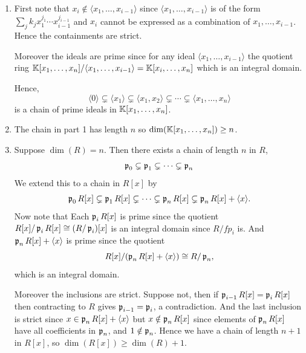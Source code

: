 \documentclass[Notebook.tex]{subfiles}
\begin{document}
\begin{solution}
    \bbni
    \begin{enumerate}
        \item First note that $x_i \notin \langle x_1, \ldots, x_{i-1}\rangle$ since $\langle x_1, \ldots, x_{i-1}\rangle$ is of the form $\sum_j k_jx_1^{j_1} \cdots x_{i-1}^{j_{i-1}}$ and $x_i$ cannot be expressed as a combination of $x_1, \ldots, x_{i-1}$. Hence the containments are strict. 
        
        Moreover the ideals are prime since for any ideal $\langle x_1, \ldots, x_{i-1}\rangle$ the quotient ring $\mathbb K[x_1, \ldots, x_n]/\langle x_1, \ldots, x_{i-1}\rangle = \mathbb K[x_{i}, \ldots, x_n]$ which is an integral domain. 

        Hence,  \[
        \langle 0\rangle
        \subsetneq
        \langle x_1\rangle
        \subsetneq
        \langle x_1,x_2\rangle
        \subsetneq
        \cdots
        \subsetneq
        \langle x_1,\ldots,x_n\rangle
        \]
        is a chain of prime ideals in $\mathbb K[x_1,\ldots,x_n]$.

        \item The chain in part 1 has length $n$ so $\dim(\mathbb K[x_1, \ldots, x_n]) \geq n$. 
        
        \item Suppose $\dim(R) = n$. Then there exists a chain of length $n$ in $R$, 
        \[\operatorname{\mathfrak{p}}_0 \subsetneq \operatorname{\mathfrak{p}}_1 \subsetneq \cdots \subsetneq \operatorname{\mathfrak{p}}_n\]
        We extend this to a chain in $R[x]$ by 
        \[
        \operatorname{\mathfrak{p}}_0R[x] \subsetneq \operatorname{\mathfrak{p}}_1R[x] \subsetneq \cdots \subsetneq \operatorname{\mathfrak{p}}_nR[x] \subsetneq \operatorname{\mathfrak{p}}_nR[x] + \langle x\rangle.
        \]
        Now note that Each $\operatorname{\mathfrak{p}}_iR[x]$ is prime since the quotient $R[x]/\operatorname{\mathfrak{p}}_iR[x] \cong (R/\operatorname{\mathfrak{p}}_i)[x]$ is an integral domain since $R/fp_i$ is. And $\operatorname{\mathfrak{p}}_nR[x] + \langle x\rangle$ is prime since the quotient 
        \[R[x]/(\operatorname{\mathfrak{p}}_nR[x] + \langle x\rangle) \cong R/\operatorname{\mathfrak{p}}_n,\]
        which is an integral domain.

        
        Moreover the inclusions are strict. Suppose not, then if $\operatorname{\mathfrak{p}}_{i-1}R[x] = \operatorname{\mathfrak{p}}_iR[x]$ then contracting to $R$ gives $\operatorname{\mathfrak{p}}_{i-1} = \operatorname{\mathfrak{p}}_i$, a contradiction. And the last  inclusion is strict since $x \in \operatorname{\mathfrak{p}}_nR[x] + \langle x\rangle$ but $x \notin \operatorname{\mathfrak{p}}_nR[x]$ since elements of $\operatorname{\mathfrak{p}}_nR[x]$ have all coefficients in $\operatorname{\mathfrak{p}}_n$, and $1 \notin \operatorname{\mathfrak{p}}_n$. 
        Hence we have a chain of length $n+1$ in $R[x]$, so $\dim(R[x]) \geq \dim(R) + 1$.
    \end{enumerate}
\end{solution}
\end{document}

